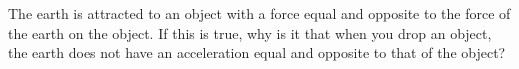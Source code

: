 The earth is attracted to an object with a force equal
        and opposite to the force of the earth on the object. If
        this is true, why is it that when you drop an object, the
        earth does not have an acceleration equal and opposite to
        that of the object?
